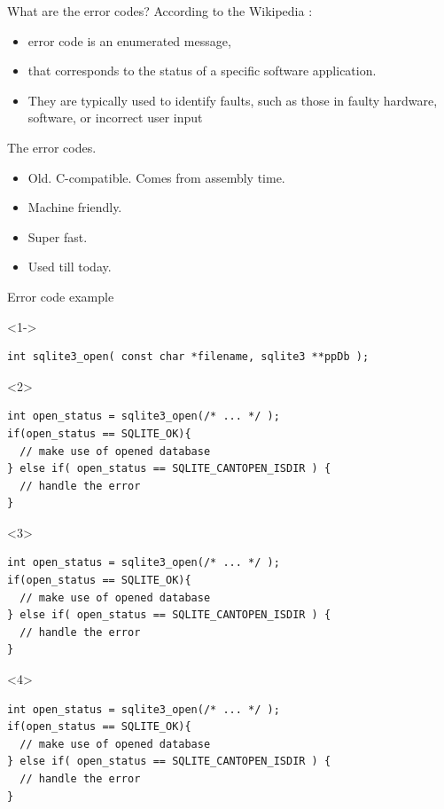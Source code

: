 \documentclass[10pt]{beamer}
\begin{document}
\begin{frame}{What are the error codes?}
	According to the \alert{Wikipedia} :
	\begin{itemize}[<+- | alert@+>]
		\item error code is an enumerated message,
		\item that corresponds to the status of a specific software application.
		\item They are typically used to identify faults, such as those in faulty hardware, software, or incorrect user input
	\end{itemize}
\end{frame}

\begin{frame}{The error codes.}
	\begin{itemize}[<+- | alert@+>]
		\item Old. C-compatible. Comes from assembly time.
		\item Machine friendly.
		\item Super fast.
		\item Used till today.
	\end{itemize}
\end{frame}

\begin{frame}[fragile]{Error code example}
	\begin{onlyenv}<1->
	\begin{verbatim}
int sqlite3_open( const char *filename, sqlite3 **ppDb );
	\end{verbatim}
	\end{onlyenv}
	
	\begin{onlyenv}
	\hrulefill
	
	\begin{verbatim}
int open_status = sqlite3_open(/* ... */ );
if(open_status == SQLITE_OK){
  // make use of opened database
} else if( open_status == SQLITE_CANTOPEN_ISDIR ) {
  // handle the error
}
	\end{verbatim}
	\end{onlyenv}
	
	\begin{onlyenv}

	\hrulefill
	\begin{verbatim}
int open_status = sqlite3_open(/* ... */ );
if(open_status == SQLITE_OK){
  // make use of opened database
} else if( open_status == SQLITE_CANTOPEN_ISDIR ) {
  // handle the error
}
	\end{verbatim}

	\end{onlyenv}
	\begin{onlyenv}
	\begin{verbatim}
int open_status = sqlite3_open(/* ... */ );
if(open_status == SQLITE_OK){
  // make use of opened database
} else if( open_status == SQLITE_CANTOPEN_ISDIR ) {
  // handle the error
}
\end{verbatim}
	\end{onlyenv}

\end{frame}
\end{document}
